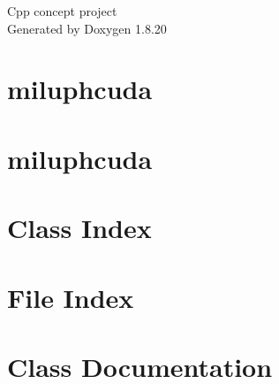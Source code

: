 \let\mypdfximage\pdfximage\def\pdfximage{\immediate\mypdfximage}\documentclass[twoside]{book}
\newcommand{\+}{\discretionary{\mbox{\scriptsize$\hookleftarrow$}}{}{}}
\newcommand{\clearemptydoublepage}{%
  \newpage{\pagestyle{empty}\cleardoublepage}%
}
\begin{document}
\hypersetup{pageanchor=false,
             bookmarksnumbered=true,
             pdfencoding=unicode
            }
\begin{titlepage}
\vspace*{7cm}
\begin{center}%
{\Large Cpp concept project }\\
\vspace*{1cm}
{\large Generated by Doxygen 1.8.20}\\
\end{center}
\end{titlepage}
\clearemptydoublepage
{}
\tableofcontents
\clearemptydoublepage
{}
\hypersetup{pageanchor=true}

\chapter{miluphcuda}
\label{index}\hypertarget{index}{}
\chapter{miluphcuda}
\label{md__r_e_a_d_m_e}

\chapter{Class Index}

\chapter{File Index}

\chapter{Class Documentation}




\end{document}
